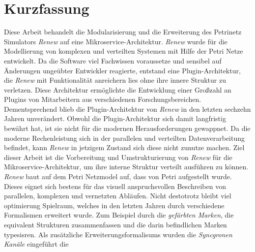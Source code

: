 




\newpage

\chapter*{Kurzfassung}
Diese Arbeit behandelt die Modularisierung und die Erweiterung des Petrinetz Simulators \textit{Renew} auf eine Mikroservice-Architektur.
\textit{Renew} wurde für die Modellierung von komplexen und verteilten Systemen mit Hilfe der Petri Netze entwickelt. 
Da die Software viel Fachwissen voraussetze und sensibel auf Änderungen ungeübter Entwickler reagierte, entstand eine Plugin-Architektur, die \textit{Renew} mit Funktionalität anreichern lies ohne ihre innere Struktur zu verletzen. 
Diese Architektur ermöglichte die Entwicklung einer Großzahl an Plugins von Mitarbeitern aus verschiedenen Forschungsbereichen.
Dementsprechend blieb die Plugin-Architektur von \textit{Renew} in den letzten sechzehn Jahren unverändert.     
\bigbreak
Obwohl die Plugin-Architektur sich damit langfristig bewährt hat, ist sie nicht für die modernen Herausforderungen gewappnet. Da die moderne Rechenleistung sich in der parallelen und verteilten Datenverarbeitung befindet, kann \textit{Renew} in jetzigem Zustand sich diese nicht zunutze machen. 
Ziel dieser Arbeit ist die Vorbereitung und Umstrukturierung von \textit{Renew} für die Mikroservice-Architektur, um ihre interne Struktur verteilt ausführen zu können.
\bigbreak
\textit{Renew} baut auf dem Petri Netzmodel auf, dass von Petri \cite{Petri62} aufgestellt wurde. 
Dieses eignet sich bestens für das visuell anspruchsvollen Beschreiben von parallelen, komplexen und vernetzten Abläufen. 
Nicht destotrotz bleibt viel optimierung Spielraum, welches in den letzten Jahren  durch verschiedene Formalismen erweitert wurde.     
Zum Beispiel durch die \textit{gefärbten Marken}, die equivalent Strukturen zusammenfassen und die darin befindlichen Marken typesisren.
Als zusätzliche Erweiterungsformalisums wurden die \textit{Syncgronen Kanäle}  eingeführt die 
 


